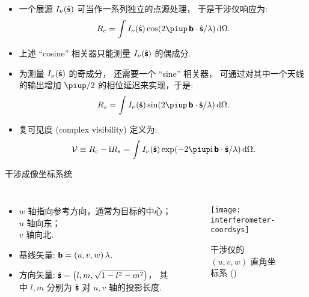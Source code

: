 \documentclass{beamer}
\begin{document}
\begin{frame}
  \begin{itemize}
    \item 一个展源 $I_{\nu}(\hat{\bm{\mathsf{s}}})$ 可当作一系列独立的点源处理，
      于是干涉仪响应为:
      \begin{equation}
        R_c = \int I_{\nu}(\hat{\B{s}})
          \cos (2\Cpi\, \B{b} \cdot \hat{\B{s}} / \lambda) \,\D{\Omega} .
      \end{equation}
    \item 上述 \enquote{cosine} 相关器只能测量 $I_{\nu}(\hat{\bm{\mathsf{s}}})$ 的偶成分.
    \item 为测量 $I_{\nu}(\hat{\bm{\mathsf{s}}})$ 的奇成分，
      还需要一个 \enquote{sine} 相关器，
      可通过对其中一个天线的输出增加 $\Cpi/2$ 的相位延迟来实现，于是:
      \begin{equation}
        R_s = \int I_{\nu}(\hat{\B{s}})
          \sin (2\Cpi\, \B{b} \cdot \hat{\B{s}} / \lambda) \,\D{\Omega} .
      \end{equation}
    \item \alert{复可见度 (complex visibility)} 定义为:
      \begin{equation}
        \mathcal{V}
          \equiv R_c - \Ci R_s
          = \int I_{\nu}(\hat{\B{s}})
            \exp (- 2\Cpi\Ci\, \B{b} \cdot \hat{\B{s}} / \lambda)
            \,\D{\Omega} .
      \end{equation}
  \end{itemize}
\end{frame}

\begin{frame}{干涉成像坐标系统}
  \begin{columns}
    \begin{itemize}
      \item $w$ 轴指向参考方向，通常为目标的中心； \\
        $u$ 轴向东； \\
        $v$ 轴向北.
      \item 基线矢量: $\bm{\mathsf{b}} = (u,v,w) \,\lambda$.
      \item 方向矢量: $\hat{\bm{\mathsf{s}}} = \left( l, m, \sqrt{1-l^2-m^2} \right)$，
        其中 $l, m$ 分别为 $\hat{\bm{\mathsf{s}}}$ 对 $u, v$ 轴的投影长度.
    \end{itemize}

    \begin{figure}
      \centering
      \texttt{[image: interferometer-coordsys]}
      \caption{干涉仪的 $(u,v,w)$ 直角坐标系 (\cite{thompson2017})}
    \end{figure}
  \end{columns}
\end{frame}
\end{document}
